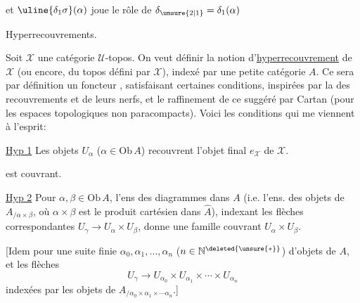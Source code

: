 et $\uline{\delta_1\sigma}(\alpha)$ joue le rôle de $\delta_{\unsure{2|1}}=\delta_1(\alpha)$

Hyperrecouvrements.

Soit $\mathcal X$ une catégorie $\mathcal U$-topos. On veut définir  la notion d'\uline{hyperrecouvrement} de $\mathcal X$ (ou encore, du topos défini par $\mathcal X$), indexé par une petite catégorie $A$.  Ce sera par définition un foncteur
, satisfaisant certaines conditions, inspirées par la   des recouvrements et de leurs nerfs, et le raffinement de ce  suggéré par Cartan (pour les espaces topologiques non paracompacts). Voici les conditions qui me viennent à l'esprit:

\uline{Hyp 1} Les objets $U_\alpha$ ($\alpha\in\mathrm{Ob}\,A$) recouvrent l'objet final $e_{\mathcal X}$ de $\mathcal X$.


est couvrant.

\uline{Hyp 2} Pour $\alpha,\beta\in\mathrm{Ob}\,A$, l'ens des  diagrammes
\diagram{\begin{tikzcd}[ampersand replacement=\&,column sep=small,row sep=small]\&\alpha\\\gamma\arrow[ur]\arrow[dr]\&\\\&\beta\end{tikzcd}}
dans $A$ (i.e. l'ens. des objets de $A_{/\alpha\times\beta}$, où $\alpha\times\beta$ est le produit cartésien dans $\widehat A$), indexant les flèches correspondantes $U_\gamma\longrightarrow U_\alpha\times U_\beta$, donne une famille couvrant $U_\alpha\times U_\beta$.

[Idem pour une suite finie  $\alpha_0,\alpha_1,\ldots,\alpha_n$ ($n\in\mathbb N^{\deleted{\unsure{*}}}$) d'objets de $A$, et les  flèches
\[U_\gamma\longrightarrow U_{\alpha_0}\times U_{\alpha_1}\times\cdots\times U_{\alpha_n}\]
indexées par les objets de $A_{/\alpha_0\times\alpha_1\times\cdots\alpha_n}$.]

